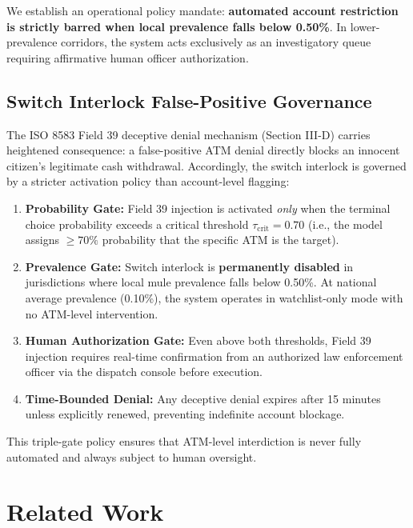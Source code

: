 \documentclass[conference]{IEEEtran}
\begin{document}
We establish an operational policy mandate: \textbf{automated account restriction is strictly barred when local prevalence falls below 0.50\%}. In lower-prevalence corridors, the system acts exclusively as an investigatory queue requiring affirmative human officer authorization.

\subsection{Switch Interlock False-Positive Governance}
The ISO 8583 Field 39 deceptive denial mechanism (Section III-D) carries heightened consequence: a false-positive ATM denial directly blocks an innocent citizen's legitimate cash withdrawal. Accordingly, the switch interlock is governed by a stricter activation policy than account-level flagging:
\begin{enumerate}
    \item \textbf{Probability Gate:} Field 39 injection is activated \textit{only} when the terminal choice probability exceeds a critical threshold $\tau_{\text{crit}} = 0.70$ (i.e., the model assigns $\ge 70\%$ probability that the specific ATM is the target).
    \item \textbf{Prevalence Gate:} Switch interlock is \textbf{permanently disabled} in jurisdictions where local mule prevalence falls below 0.50\%. At national average prevalence (0.10\%), the system operates in watchlist-only mode with no ATM-level intervention.
    \item \textbf{Human Authorization Gate:} Even above both thresholds, Field 39 injection requires real-time confirmation from an authorized law enforcement officer via the dispatch console before execution.
    \item \textbf{Time-Bounded Denial:} Any deceptive denial expires after 15 minutes unless explicitly renewed, preventing indefinite account blockage.
\end{enumerate}
This triple-gate policy ensures that ATM-level interdiction is never fully automated and always subject to human oversight.

\section{Related Work}
\end{document}
